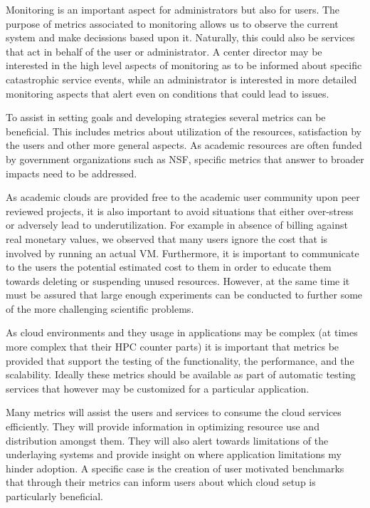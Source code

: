 \documentclass{sig-alternate-05-2015}
\begin{document}
\begin{description}
\setlength\itemsep{-2pt}

\item[\it  Monitoring.] Monitoring is an important aspect for
  administrators but also for users. The purpose of metrics associated
  to monitoring allows us to observe the current system and make
  decissions based upon it. Naturally, this could also be services
  that act in behalf of the user or administrator. A center director
  may be interested in the high level aspects of monitoring as to be
  informed about specific catastrophic service events, while an
  administrator is interested in more detailed monitoring aspects that
  alert even on conditions that could lead to issues.

\item[\it  Planning.] To assist in setting goals and developing strategies
  several metrics can be beneficial. This includes metrics about
  utilization of the resources, satisfaction by the users and other
  more general aspects. As academic resources are often funded by
  government organizations such as NSF, specific metrics that answer
  to broader impacts need to be addressed.

\item[\it  Billing.] As academic clouds are provided free to the academic
  user community upon peer reviewed projects, it is also important to
  avoid situations that either over-stress or adversely lead to
  underutilization. For example in absence of billing against real
  monetary values, we observed that many users ignore the cost that is
  involved by running an actual VM. Furthermore, it is important to
  communicate to the users the potential estimated cost to them in
  order to educate them towards deleting or suspending unused
  resources. However, at the same time it must be assured that large
  enough experiments can be conducted to further some of the more
  challenging scientific problems.

\item[\it  Testing.] As cloud environments and they usage in applications
  may be complex (at times more complex that their HPC counter parts)
  it is important that metrics be provided that support the testing of
  the functionality, the performance, and the scalability. Ideally
  these metrics should be available as part of automatic testing
  services that however may be customized for a particular application.

\item[\it  Consuming.] Many metrics will assist the users and services to
  consume the cloud services efficiently. They will provide
  information in optimizing resource use and distribution amongst
  them. They will also alert towards limitations of the underlaying
  systems and provide insight on where application limitations my
  hinder adoption. A specific case is the creation of user motivated
  benchmarks that through their metrics can inform users about which
  cloud setup is particularly beneficial.


\end{description}
\end{document}

